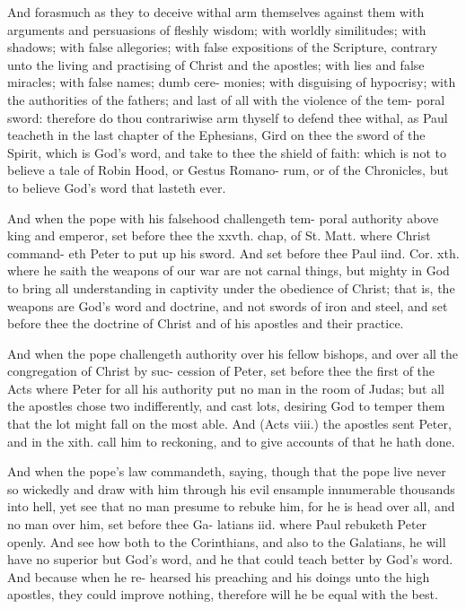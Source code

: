 \documentclass{custom}
\begin{document}
And forasmuch as they to deceive withal arm themselves 
against them with arguments and persuasions of fleshly 
wisdom; with worldly similitudes; with shadows; with false 
allegories; with false expositions of the Scripture, contrary 
unto the living and practising of Christ and the apostles; 
with lies and false miracles; with false names; dumb cere- 
monies; with disguising of hypocrisy; with the authorities 
of the fathers; and last of all with the violence of the tem- 
poral sword: therefore do thou contrariwise arm thyself to 
defend thee withal, as Paul teacheth in the last chapter of 
the Ephesians, Gird on thee the sword of the Spirit, which 
is God's word, and take to thee the shield of faith: which is 
not to believe a tale of Robin Hood, or Gestus Romano- 
rum, or of the Chronicles, but to believe God's word that 
lasteth ever. 

And when the pope with his falsehood challengeth tem- 
poral authority above king and emperor, set before thee 
the xxvth. chap, of St. Matt. where Christ command- 
eth Peter to put up his sword. And set before thee 
Paul iind. Cor. xth. where he saith the weapons of our 
war are not carnal things, but mighty in God to bring all 
understanding in captivity under the obedience of Christ; 
that is, the weapons are God's word and doctrine, and not 
swords of iron and steel, and set before thee the doctrine 
of Christ and of his apostles and their practice. 

And when the pope challengeth authority over his fellow 
bishops, and over all the congregation of Christ by suc- 
cession of Peter, set before thee the first of the Acts where 
Peter for all his authority put no man in the room of 
Judas; but all the apostles chose two indifferently, and 
cast lots, desiring God to temper them that the lot might 
fall on the most able. And (Acts viii.) the apostles sent 
Peter, and in the xith. call him to reckoning, and to give 
accounts of that he hath done. 

And when the pope's law commandeth, saying, though 
that the pope live never so wickedly and draw with him 
through his evil ensample innumerable thousands into hell, 
yet see that no man presume to rebuke him, for he is head 
over all, and no man over him, set before thee Ga- 
latians iid. where Paul rebuketh Peter openly. And see 
how both to the Corinthians, and also to the Galatians, he 
will have no superior but God's word, and he that could
teach better by God's word. And because when he re-
hearsed his preaching and his doings unto the high apostles,
they could improve nothing, therefore will he be equal 
with the best. 
\end{document}
